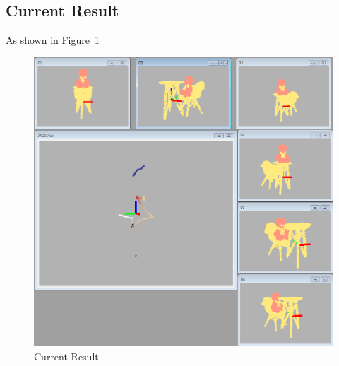 \subsection{Current Result}
As shown in Figure~\ref{fig:current_result}
\begin{figure}
	\centering
	\includegraphics[width=\textwidth]{images/result_iter_18.png}
	\caption{Current Result}
	\label{fig:current_result}
\end{figure}\\
